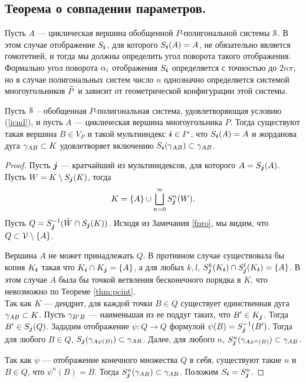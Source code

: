 
\subsection{Теорема о совпадении параметров.}

Пусть $A$ --- циклическая вершина обобщенной $P$-полигональной системы ${\EuScript S}$. 
В этом случае отображение $S_{\bm{i}}$, для которого $S_{\bm{i}}(A)=A$, не обязательно является гомотетией, и тогда мы должны определить угол поворота  такого отображения. 
Формально угол поворота $\alpha_i$ отображения $S_{\bm{i}}$ определяется с точностью до $2n\pi$, но в случае полигональных систем число $n$ однозначно определяется системой многоугольников ${\widetilde P}$ и зависит от геометрической конфигурации этой системы.



\begin{proposition}\label{fixparc}
Пусть ${\EuScript S}$ -- обобщенная $P$-полигональная система, удовлетворяющая условию (\ref{icnd}), и пусть $A$ --- циклическая вершина многоугольника $P$. 
Тогда существуют такая вершина $B\in V_{P}$ и такой мультииндекс ${\bm{i}}\in I^*$, что  $S_{{\bm{i}}}(A)=A$  и жорданова дуга $\gamma_{AB}\subset K$ удовлетворяет включению $S_{{\bm{i}}}(\gamma_{AB})\subset\gamma_{AB}$.
\end{proposition}

\begin{proof}
Пусть ${\bm{j}}$ --- кратчайший из мультииндексов, для которого $A=S_{\bm{j}}(A)$. 
Пусть $W=K\setminus S_{\bm{j}}(K)$, тогда 
$$K=\{A\}\cup\bigsqcup\limits_{n=0}^\infty S_{{\bm{j}}}^n(W).$$
Пусть $Q=S_{\bm{j}}^{-1}(\bar W\cap S_{\bm{j}}(K))$. 
Исходя из Замечания \ref{fpro}, мы видим, что $Q\subset{\mathcal V}\setminus \{A\}$. 

Вершина $A$ не может принадлежать $Q$.
В противном случае существовала бы копия $K_{\bm{i}}$ такая что $K_{\bm{i}}\cap K_{\bm{j}}=\{A\}$, а для любых $k,l$, $S_{\bm{j}}^k(K_{\bm{i}})\cap S_{\bm{j}}^l(K_{\bm{i}})=\{A\}$. 
В этом случае $A$ была бы точкой ветвления бесконечного порядка в $K$, что невозможно по Теореме \ref{thm:pcint}.\\
 
Так как  $K$ --- дендрит, для каждой точки $B\in Q$ существует единственная дуга $\gamma_{AB}\subset K$. Пусть $\gamma_{B'B}$ --- наименьшая из ее поддуг таких, что $B'\in K_{\bm{j}}$. Тогда $B'\in S_{\bm{j}}(Q)$. 
Зададим отображение $\psi:Q\to Q$ формулой $\psi(B)=S_{\bm{j}}^{-1}(B')$. 
Тогда для любого $B\in Q$, $S_{\bm{j}}(\gamma_{A\psi(B)})\subset \gamma_{AB}$. Далее, для любого $n$, $S^n_{\bm{j}}(\gamma_{A\psi^n(B)})\subset \gamma_{AB}$.

Так как $\psi$ --- отображение конечного множества $Q$ в себя, существуют такие $n$ и $B\in Q$, что $\psi^n(B)=B$. 
Тогда $S_{\bm{j}}^n(\gamma_{AB})\subset\gamma_{AB}$.
Положим $S_{\bm{i}}=S_{\bm{j}}^n$.
\end{proof}

